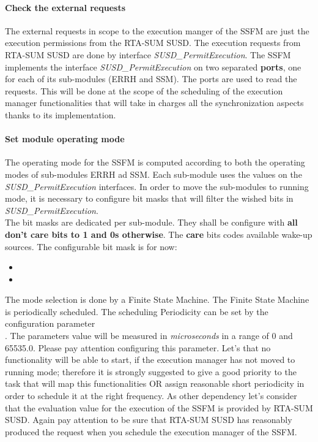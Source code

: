 \paragraph{Check the external requests} The external requests in scope to the execution manger of the SSFM are just the execution permissions from the RTA-SUM SUSD.
The execution requests from RTA-SUM SUSD are done by interface \textit{SUSD\_PermitExecution}.
The SSFM implements the interface \textit{SUSD\_PermitExecution} on two separated \textbf{ports}, one for each of its sub-modules (ERRH and SSM). The ports are used to
read the requests. This will be done at the scope of the scheduling of the execution manager functionalities that will take in charges all the synchronization aspects thanks to its implementation.

\paragraph{Set module operating mode} The operating mode for the SSFM is computed according to both the operating modes of sub-modules ERRH ad SSM.
Each sub-module uses the values on the \textit{SUSD\_PermitExecution} interfaces. In order to move the sub-modules to running mode, it is necessary to configure
bit masks that will filter the wished bits in \textit{SUSD\_PermitExecution}.\\
The bit masks are dedicated per sub-module. They shall be configure with \textbf{all don't care bits to 1 and 0s otherwise}. The \textbf{care} bits codes available wake-up sources.
The configurable bit mask is for now:

\begin{itemize}
    \item {}
	\item {}
\end{itemize}

The mode selection is done by a Finite State Machine. The Finite State Machine is periodically scheduled. The scheduling Periodicity can be 
set by the configuration parameter \\. The parameters value will be measured in \textit{microseconds} in a range of 0 and 65535.0.
Please pay attention configuring this parameter. Let's that no functionality will be able to start, if the execution manager has not moved to running mode; therefore it is strongly suggested
to give a good priority to the task that will map this functionalities OR assign reasonable short periodicity in order to schedule it at the right frequency. As other dependency let's consider that
the evaluation value for the execution of the SSFM is provided by RTA-SUM SUSD. Again pay attention to be sure that RTA-SUM SUSD has reasonably produced the request when you schedule the execution manager
of the SSFM.

